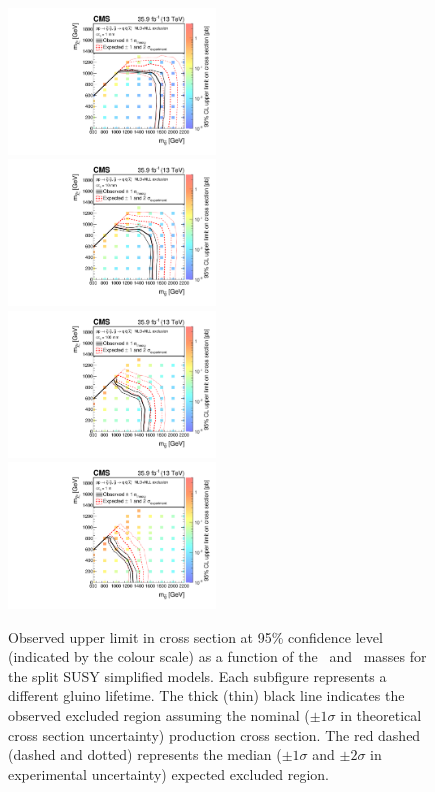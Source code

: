 \begin{figure}[!t]
\centering
\includegraphics[width=0.49\textwidth]{figs/results/T1qqqqLL1XSEC}~
\includegraphics[width=0.49\textwidth]{figs/results/T1qqqqLL10XSEC}\\
\includegraphics[width=0.49\textwidth]{figs/results/T1qqqqLL100XSEC}~
\includegraphics[width=0.49\textwidth]{figs/results/T1qqqqLL1000XSEC}
\caption{Observed upper limit in cross section at 95\% confidence level 
(indicated by the colour scale) as a function of the \gluino~and 
\neutralino~masses for the split SUSY simplified models. Each subfigure 
represents a different gluino lifetime. The thick (thin) black line indicates 
the observed excluded region assuming the nominal ($\pm1\sigma$ in theoretical 
cross section uncertainty) production cross section. The red dashed (dashed and 
dotted) represents the median ($\pm1\sigma$ and $\pm2\sigma$ in experimental 
uncertainty) expected excluded region.}
\label{fig:limits-individual-2}
\end{figure}
